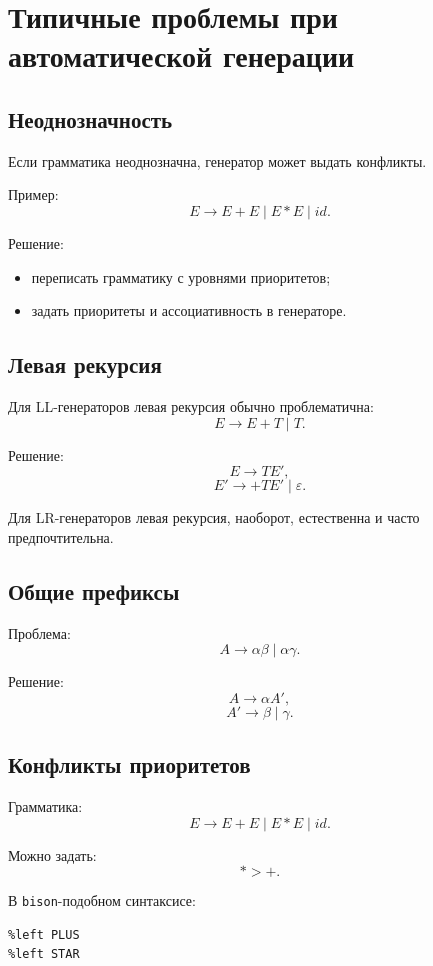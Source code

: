\documentclass[12pt,a4paper]{article}
\begin{document}
\section{Типичные проблемы при автоматической генерации}

\subsection{Неоднозначность}

Если грамматика неоднозначна, генератор может выдать конфликты.

Пример:
\[
E \to E+E \mid E*E \mid id.
\]

Решение:
\begin{itemize}
    \item переписать грамматику с уровнями приоритетов;
    \item задать приоритеты и ассоциативность в генераторе.
\end{itemize}

\subsection{Левая рекурсия}

Для LL-генераторов левая рекурсия обычно проблематична:
\[
E \to E+T \mid T.
\]

Решение:
\[
E \to T E',
\]
\[
E' \to +T E' \mid \varepsilon.
\]

Для LR-генераторов левая рекурсия, наоборот, естественна и часто предпочтительна.

\subsection{Общие префиксы}

Проблема:
\[
A \to \alpha\beta \mid \alpha\gamma.
\]

Решение:
\[
A \to \alpha A',
\]
\[
A' \to \beta \mid \gamma.
\]

\subsection{Конфликты приоритетов}

Грамматика:
\[
E \to E+E \mid E*E \mid id.
\]

Можно задать:
\[
* > +.
\]

В \texttt{bison}-подобном синтаксисе:
\begin{lstlisting}
%left PLUS
%left STAR
\end{lstlisting}
\end{document}
